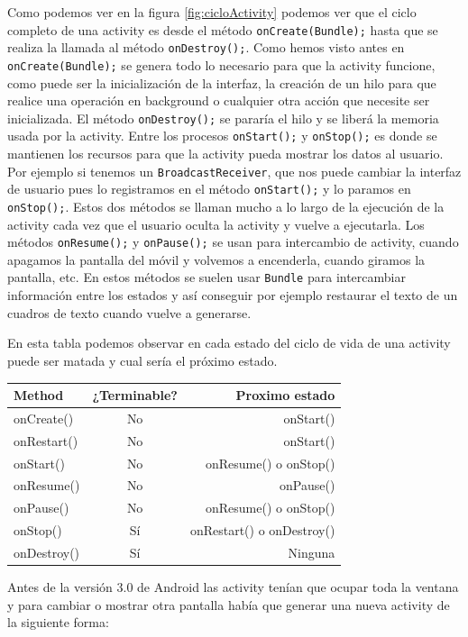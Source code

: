 Como podemos ver en la figura \ref{fig:cicloActivity} podemos ver que el ciclo completo de una activity es desde el método \lstinline{onCreate(Bundle);} hasta que se realiza la llamada al método \lstinline{onDestroy();}. Como hemos visto antes en \lstinline{onCreate(Bundle);} se genera todo lo necesario para que la activity funcione, como puede ser la inicialización de la interfaz, la creación de un hilo para que realice una operación en background o cualquier otra acción que necesite ser inicializada. El método \lstinline{onDestroy();} se pararía el hilo y se liberá la memoria usada por la activity. Entre los procesos \lstinline{onStart();} y \lstinline{onStop();} es donde se mantienen los recursos para que la activity pueda mostrar los datos al usuario. Por ejemplo si tenemos un \lstinline{BroadcastReceiver}, que nos puede cambiar la interfaz de usuario pues lo registramos en el método \lstinline{onStart();} y lo paramos en \lstinline{onStop();}. Estos dos métodos se llaman mucho a lo largo de la ejecución de la activity cada vez que el usuario oculta la activity y vuelve a ejecutarla. Los métodos \lstinline{onResume();} y \lstinline{onPause();} se usan para intercambio de activity, cuando apagamos la pantalla del móvil y volvemos a encenderla, cuando giramos la pantalla, etc. En estos métodos se suelen usar \lstinline{Bundle} para intercambiar información entre los estados y así conseguir por ejemplo restaurar el texto de un cuadros de texto cuando vuelve a generarse.

En esta tabla podemos observar en cada estado del ciclo de vida de una activity puede ser matada y cual sería el próximo estado.
\begin{center}
\begin{tabular}{|l | c | r|}

\hline
Method & ¿Terminable? & Proximo estado\\
\hline
onCreate() & No & onStart()\\
\hline
onRestart() & No & onStart()\\
\hline
onStart() & No & onResume() o onStop()\\
\hline
onResume() & No & onPause()\\
\hline
onPause() & No  & onResume() o onStop()\\
\hline
onStop() & Sí & onRestart() o onDestroy()\\
\hline
onDestroy() & Sí & Ninguna\\
\hline

\end{tabular}
\end{center}
Antes de la versión 3.0 de Android las activity tenían que ocupar toda la ventana y para cambiar o mostrar otra pantalla había que generar una nueva activity de la siguiente forma:

